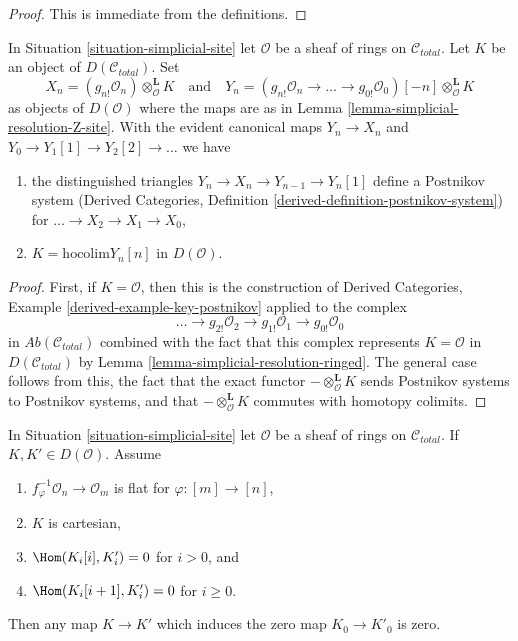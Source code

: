 \begin{proof}
This is immediate from the definitions.
\end{proof}

\begin{lemma}
\label{lemma-modules-postnikov}
In Situation \ref{situation-simplicial-site} let $\mathcal{O}$
be a sheaf of rings on $\mathcal{C}_{total}$. Let $K$ be
an object of $D(\mathcal{C}_{total})$. Set
$$
X_n = (g_{n!}\mathcal{O}_n)
\otimes^\mathbf{L}_\mathcal{O} K
\quad\text{and}\quad
Y_n =
(g_{n!}\mathcal{O}_n \to \ldots \to g_{0!}\mathcal{O}_0)[-n]
\otimes^\mathbf{L}_\mathcal{O} K
$$
as objects of $D(\mathcal{O})$ where the maps are
as in Lemma \ref{lemma-simplicial-resolution-Z-site}.
With the evident canonical maps $Y_n \to X_n$ and
$Y_0 \to Y_1[1] \to Y_2[2] \to \ldots$ we have
\begin{enumerate}
\item the distinguished triangles $Y_n \to X_n \to Y_{n - 1} \to Y_n[1]$
define a Postnikov system
(Derived Categories, Definition \ref{derived-definition-postnikov-system})
for $\ldots \to X_2 \to X_1 \to X_0$,
\item $K = \text{hocolim} Y_n[n]$ in $D(\mathcal{O})$.
\end{enumerate}
\end{lemma}

\begin{proof}
First, if $K = \mathcal{O}$, then this is the construction of
Derived Categories, Example \ref{derived-example-key-postnikov}
applied to the complex
$$
\ldots \to
g_{2!}\mathcal{O}_2 \to
g_{1!}\mathcal{O}_1 \to
g_{0!}\mathcal{O}_0
$$
in $\textit{Ab}(\mathcal{C}_{total})$ combined with the fact that
this complex represents $K = \mathcal{O}$ in $D(\mathcal{C}_{total})$
by Lemma \ref{lemma-simplicial-resolution-ringed}.
The general case follows from this, the fact that the exact functor
$- \otimes^\mathbf{L}_\mathcal{O} K$ sends Postnikov systems to
Postnikov systems, and
that $- \otimes^\mathbf{L}_\mathcal{O} K$ commutes with homotopy colimits.
\end{proof}

\begin{lemma}
\label{lemma-nullity-cartesian-modules-derived}
In Situation \ref{situation-simplicial-site} let $\mathcal{O}$ be
a sheaf of rings on $\mathcal{C}_{total}$.
If $K, K' \in D(\mathcal{O})$.
Assume
\begin{enumerate}
\item $f_\varphi^{-1}\mathcal{O}_n \to \mathcal{O}_m$ is flat for
$\varphi : [m] \to [n]$,
\item $K$ is cartesian,
\item $\Hom(K_i[i], K'_i) = 0$ for $i > 0$, and
\item $\Hom(K_i[i + 1], K'_i) = 0$ for $i \geq 0$.
\end{enumerate}
Then any map $K \to K'$ which induces the zero map $K_0 \to K'_0$ is zero.
\end{lemma}


